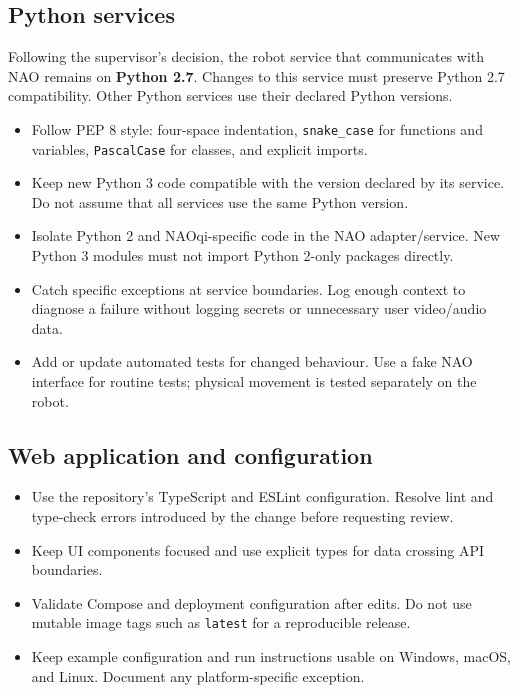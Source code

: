 \documentclass[12pt,a4paper]{article}
\begin{document}
\subsection{Python services}

Following the supervisor's decision, the robot service that communicates with NAO remains on \textbf{Python 2.7}. Changes to this service must preserve Python 2.7 compatibility. Other Python services use their declared Python versions.

\begin{itemize}

\item Follow PEP 8 style: four-space indentation, \texttt{snake\_case} for functions and variables, \texttt{PascalCase} for classes, and explicit imports.

\item Keep new Python 3 code compatible with the version declared by its service. Do not assume that all services use the same Python version.

\item Isolate Python 2 and NAOqi-specific code in the NAO adapter/service. New Python 3 modules must not import Python 2-only packages directly.

\item Catch specific exceptions at service boundaries. Log enough context to diagnose a failure without logging secrets or unnecessary user video/audio data.

\item Add or update automated tests for changed behaviour. Use a fake NAO interface for routine tests; physical movement is tested separately on the robot.

\end{itemize}

\subsection{Web application and configuration}

\begin{itemize}

\item Use the repository's TypeScript and ESLint configuration. Resolve lint and type-check errors introduced by the change before requesting review.

\item Keep UI components focused and use explicit types for data crossing API boundaries.

\item Validate Compose and deployment configuration after edits. Do not use mutable image tags such as \texttt{latest} for a reproducible release.

\item Keep example configuration and run instructions usable on Windows, macOS, and Linux. Document any platform-specific exception.

\end{itemize}
\end{document}
